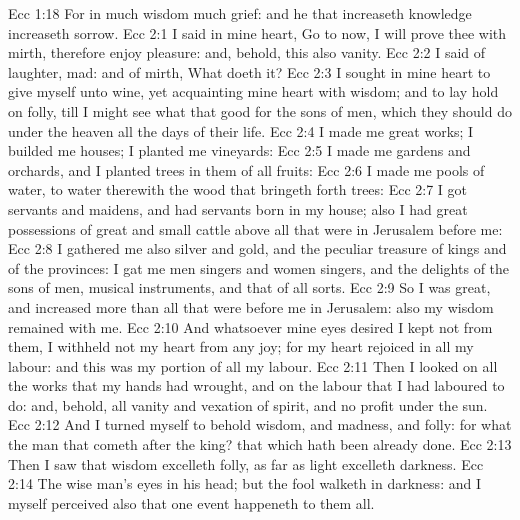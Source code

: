 \vs Ecc 1:18 For in much wisdom  much grief: and he that increaseth knowledge increaseth sorrow.
\vs Ecc 2:1 I said in mine heart, Go to now, I will prove thee with mirth, therefore enjoy pleasure: and, behold, this also  vanity.
\vs Ecc 2:2 I said of laughter,  mad: and of mirth, What doeth it?
\vs Ecc 2:3 I sought in mine heart to give myself unto wine, yet acquainting mine heart with wisdom; and to lay hold on folly, till I might see what  that good for the sons of men, which they should do under the heaven all the days of their life.
\vs Ecc 2:4 I made me great works; I builded me houses; I planted me vineyards:
\vs Ecc 2:5 I made me gardens and orchards, and I planted trees in them of all  fruits:
\vs Ecc 2:6 I made me pools of water, to water therewith the wood that bringeth forth trees:
\vs Ecc 2:7 I got  servants and maidens, and had servants born in my house; also I had great possessions of great and small cattle above all that were in Jerusalem before me:
\vs Ecc 2:8 I gathered me also silver and gold, and the peculiar treasure of kings and of the provinces: I gat me men singers and women singers, and the delights of the sons of men,  musical instruments, and that of all sorts.
\vs Ecc 2:9 So I was great, and increased more than all that were before me in Jerusalem: also my wisdom remained with me.
\vs Ecc 2:10 And whatsoever mine eyes desired I kept not from them, I withheld not my heart from any joy; for my heart rejoiced in all my labour: and this was my portion of all my labour.
\vs Ecc 2:11 Then I looked on all the works that my hands had wrought, and on the labour that I had laboured to do: and, behold, all  vanity and vexation of spirit, and  no profit under the sun.
\vs Ecc 2:12 And I turned myself to behold wisdom, and madness, and folly: for what  the man  that cometh after the king?  that which hath been already done.
\vs Ecc 2:13 Then I saw that wisdom excelleth folly, as far as light excelleth darkness.
\vs Ecc 2:14 The wise man's eyes  in his head; but the fool walketh in darkness: and I myself perceived also that one event happeneth to them all.
